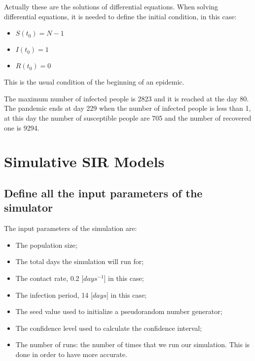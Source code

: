 \documentclass[twocolumn,letterpaper]{report}
\begin{document}
{								\noindent
								Actually these are the solutions of differential equations. When solving differential equations, it is needed to define the initial condition, in this case:
								\begin{itemize}
								  \item[] \hspace{25mm} $S(t_{0}) = N - 1$
									\item[] \hspace{25mm} $I(t_{0}) = 1$
									\item[] \hspace{25mm} $R(t_{0}) = 0$
								\end{itemize}
								This is the usual condition of the beginning of an epidemic.
							
\noindent
The maximum number of infected people is 2823 and it is reached at the day 80. The pandemic ends at day 229 when the number of infected people is less than 1, at this day the number of susceptible people are 705 and the number of recovered one is 9294.
			
			
			\section{Simulative SIR Models}
			
			\subsection{Define all the input parameters of the simulator}
					The input parameters of the simulation are:
					\begin{itemize}
						\item The population size;
						\item The total days the simulation will run for;
						\item The contact rate, 0.2 [$days^{-1}$] in this case;
						\item The infection period, 14 [$days$] in this case;
						\item The seed value used to initialize a pseudorandom number generator;
						\item The confidence level used to calculate the confidence interval;
						\item The number of runs: the number of times that we run our simulation. This is done in order to have more accurate.
					\end{itemize}
					 
}
\end{document}
